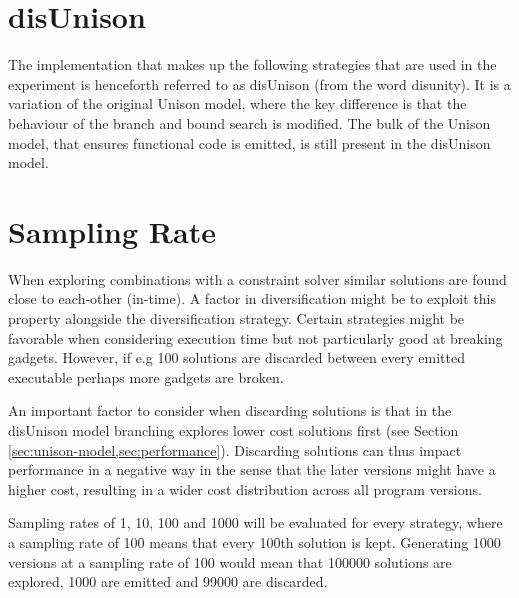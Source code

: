 

\section{disUnison}

The implementation that makes up the following strategies that are used in the experiment
is henceforth referred to as disUnison (from the word disunity). It is a variation of the
original Unison model, where the key difference is that the behaviour of the branch and
bound search is modified. The bulk of the Unison model, that ensures functional code is
emitted, is still present in the disUnison model.



\section{Sampling Rate}
\label{sec:sampling_rate}

When exploring combinations with a constraint solver similar solutions are found close to
each-other (in-time). A factor in diversification might be to exploit this property
alongside the diversification strategy. Certain strategies might be favorable when
considering execution time but not particularly good at breaking gadgets. However, if
e.g 100 solutions are discarded between every emitted executable perhaps more gadgets are
broken.

An important factor to consider when discarding solutions is that in the disUnison model
branching explores lower cost solutions first (see Section \ref{sec:unison-model,sec:performance}).
Discarding solutions can thus impact performance in a negative way in the sense that the
later versions might have a higher cost, resulting in a wider cost distribution across all
program versions.

Sampling rates of 1, 10, 100 and 1000 will be evaluated for every strategy, where a
sampling rate of 100 means that every 100th solution is kept. Generating 1000 versions
at a sampling rate of 100 would mean that 100000 solutions are explored, 1000 are emitted
and 99000 are discarded.

